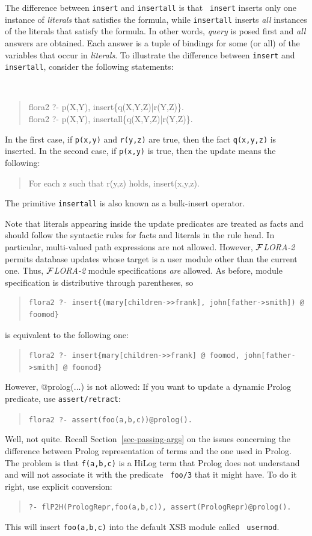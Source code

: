 \documentclass[11pt]{article}
\newcommand{\FLORA}{{\mbox{${\cal F}${\small\it LORA}\rm\emph{-2}}}\xspace}
\begin{document}
The difference between {\tt insert} and {\tt insertall} is that {\tt
  insert} inserts only one instance of \emph{literals} that satisfies the
formula, while {\tt insertall} inserts \emph{all} instances of the literals
that satisfy the formula. In other words, \emph{query} is posed first and
\emph{all} answers are obtained. Each answer is a tuple of bindings for
some (or all) of the variables that occur in \emph{literals}.  To
illustrate the difference between {\tt insert} and {\tt insertall},
consider the following statements:
{\tt
\begin{quote}
  flora2  ?- p(X,Y), insert\{q(X,Y,Z)|r(Y,Z)\}.\\
  flora2  ?- p(X,Y), insertall\{q(X,Y,Z)|r(Y,Z)\}.
\end{quote}
}
In the first case, if {\tt p(x,y)} and {\tt r(y,z)} are true, then the fact
{\tt q(x,y,z)} is inserted. In the second case, if {\tt p(x,y)} is true,
then the update means the following:
\begin{quote}
  For each z such that r(y,z) holds, insert(x,y,z).
\end{quote}
The primitive {\tt insertall} is also known as a bulk-insert operator.

Note that literals appearing inside the update predicates are treated as
facts and should follow the syntactic rules for facts and literals in the
rule head. In particular, multi-valued path expressions are not allowed.
However, \FLORA permits database updates whose target is a user module
other than the current one.  Thus, \FLORA module specifications \emph{are}
allowed. As before, module specification is distributive through
parentheses, so
\begin{quote}
\begin{verbatim}
flora2 ?- insert{(mary[children->>frank], john[father->smith]) @ foomod}
\end{verbatim}
\end{quote}
is equivalent to the following one:
\begin{quote}
\verb|flora2 ?- insert{mary[children->>frank] @ foomod, john[father->smith] @ foomod}|
\end{quote}

However, @prolog(...) is not allowed: If you want to update a dynamic Prolog
predicate, use {\tt assert/retract}:
\begin{quote}
 {\tt flora2 ?- assert(foo(a,b,c))@prolog().  }
\end{quote}
Well, not quite. Recall Section~\ref{sec-passing-args} on the issues
concerning the difference between Prolog representation of terms and the
one used in Prolog. The problem is that {\tt f(a,b,c)} is a HiLog term that
Prolog does not understand and will not associate it with the predicate {\tt
  foo/3}  that it might have. To do it right, use explicit conversion:
\begin{quote}
 {\tt ?- flP2H(PrologRepr,foo(a,b,c)), assert(PrologRepr)@prolog().  }
\end{quote}
This will insert {\tt foo(a,b,c)} into the default XSB module called {\tt
  usermod}.
\end{document}

